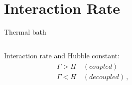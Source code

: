 \section{Interaction Rate}

\begin{frame}{Thermal bath}
\begin{columns}
    \begin{column}{0.5\textwidth}
    Interaction rate and Hubble constant:
        \begin{align}
	    \label{eq}
	    \begin{array}{ll}
		\Gamma > H \quad (coupled) \\
		\Gamma < H \quad (decoupled)\,,
	    \end{array}
        \end{align}
    \end{column}
    \begin{column}{0.5\textwidth}
\begin{center}
\end{center}
    \end{column}
\end{columns}
\end{frame}
    
